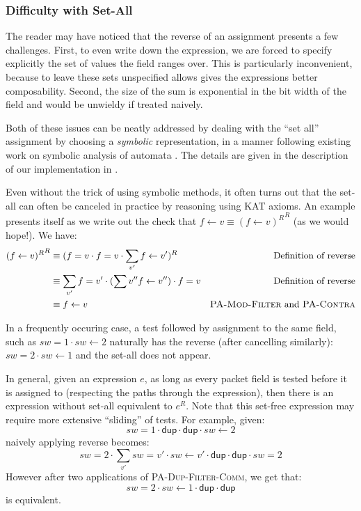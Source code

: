 \documentclass[acmsmall,dvipsnames,nonacm]{acmart}
\makeatletter
\newcommand{\mm}[1]{\todo[noinline,color=green]{\footnotesize MM\@: #1}}
\newcommand\dup{\mathsf{dup}}
\makeatother
\begin{document}
\subsubsection{Difficulty with Set-All}\label{sec:set-all}
The reader may have noticed that the reverse of an assignment
presents a few challenges.
First, to even write down the expression, we are forced to specify explicitly the
set of values the field ranges over. This is particularly inconvenient, because
to leave these sets unspecified allows gives the expressions better
composability.
Second, the size of the sum is exponential in the bit width of the field and
would be unwieldy if treated naively.

Both of these issues can be neatly addressed by dealing with the ``set all''
assignment by choosing a \emph{symbolic} representation, in a
manner following existing work on symbolic analysis of automata
\cite{pous2015,dantoni-veanes2014,dantoni-veanes2017}. The details are given in the description of our
implementation in .

Even without the trick of using symbolic methods, it often turns out that the
set-all can often be canceled in practice by reasoning using KAT axioms.
An example presents itself as we write out the check that $f \gets v \equiv {(f \gets v)^R}^R$ (as
we would hope!). We have:
\begin{align*}
    {(f \gets v)^R}^R &\equiv (f=v \cdot f=v \cdot \sum_{v'} f \gets v')^R & \text{Definition of reverse} \\
                      &\equiv \sum_{v'} f=v' \cdot (\sum{v''} f\gets v'')  \cdot
                      f=v & \text{Definition of reverse} \\
                      &\equiv  f\gets v & \textsc{PA-Mod-Filter}\text{ and }\textsc{PA-Contra}
\end{align*}

In a frequently occuring case, a test followed by assignment to the same field,
such as
$sw=1 \cdot sw \gets 2$
naturally has the reverse (after cancelling similarly):
$sw = 2 \cdot sw \gets 1$
and the set-all does not appear.

In general, given an expression $e$, as long as every packet field is tested
before it is assigned to (respecting the paths through the expression), then
there is an expression without set-all equivalent to $e^R$. \mm{MM formalize a
bit more?} Note that this set-free expression may
require more extensive ``sliding'' of tests. For example, given:
\[sw=1 \cdot \dup \cdot \dup \cdot sw \gets 2\]
naively applying reverse becomes:
\[sw=2\cdot \sum_{v'} sw=v'\cdot sw\gets v' \cdot \dup \cdot \dup \cdot sw=2\]
However after two applications of \textsc{PA-Dup-Filter-Comm}, we get that:
\[sw=2 \cdot sw\gets 1 \cdot \dup \cdot \dup \]
is equivalent.
\end{document}
